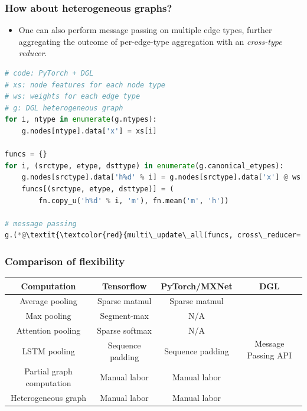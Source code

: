 \documentclass[10pt,aspectratio=169]{beamer}
\begin{document}
	\begin{frame}[fragile]
		\frametitle{How about heterogeneous graphs?}
		\begin{itemize}
			\item One can also perform message passing on multiple edge types, further aggregating the outcome of per-edge-type aggregation with an \emph{cross-type reducer}.
		\end{itemize}
\begin{lstlisting}[language=Python]
# code: PyTorch + DGL
# xs: node features for each node type
# ws: weights for each edge type
# g: DGL heterogeneous graph
for i, ntype in enumerate(g.ntypes):
    g.nodes[ntype].data['x'] = xs[i]

funcs = {}
for i, (srctype, etype, dsttype) in enumerate(g.canonical_etypes):
    g.nodes[srctype].data['h%d' % i] = g.nodes[srctype].data['x'] @ ws[etype]
    funcs[(srctype, etype, dsttype)] = (
        fn.copy_u('h%d' % i, 'm'), fn.mean('m', 'h'))

# message passing
g.(*@\textit{\textcolor{red}{multi\_update\_all(funcs, cross\_reducer='sum')}}@*)
\end{lstlisting}
	\end{frame}

	\begin{frame}
		\frametitle{Comparison of flexibility}
		\begin{tabular}{|c|ccc|}
			\hline
			Computation & Tensorflow & PyTorch/MXNet & DGL \\
			\hline
			Average pooling & Sparse matmul & Sparse matmul & \multirow{6}{*}{Message Passing API} \\
			Max pooling & Segment-max & N/A & \\
			Attention pooling & Sparse softmax & N/A & \\
			LSTM pooling & Sequence padding & Sequence padding & \\
			Partial graph computation & Manual labor & Manual labor & \\
			Heterogeneous graph & Manual labor & Manual labor & \\
			\hline
		\end{tabular}
	\end{frame}
\end{document}
